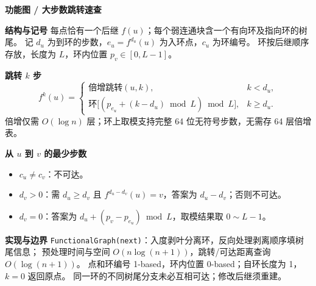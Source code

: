 \textbf{功能图 / 大步数跳转速查}

\textbf{结构与记号}
每点恰有一个后继 $f(u)$；每个弱连通块含一个有向环及指向环的树尾。
记 $d_u$ 为到环的步数，$e_u=f^{d_u}(u)$ 为入环点，$c_u$ 为环编号。
环按后继顺序存放，长度为 $L$，环内位置 $p_v\in[0,L-1]$。

\textbf{跳转 $k$ 步}
\[
f^k(u)=
\begin{cases}
\text{倍增跳转}(u,k),&k<d_u,\\
\text{环}\bigl[(p_{e_u}+(k-d_u)\bmod L)\bmod L\bigr],&k\ge d_u.
\end{cases}
\]
倍增仅需 $O(\log n)$ 层；环上取模支持完整 64 位无符号步数，无需存 64 层倍增表。

\textbf{从 $u$ 到 $v$ 的最少步数}
\begin{itemize}
    \item $c_u\ne c_v$：不可达。
    \item $d_v>0$：需 $d_u\ge d_v$ 且 $f^{d_u-d_v}(u)=v$，答案为 $d_u-d_v$；否则不可达。
    \item $d_v=0$：答案为 $d_u+(p_v-p_{e_u})\bmod L$，取模结果取 $0\sim L-1$。
\end{itemize}

\textbf{实现与边界}
\texttt{FunctionalGraph(next)}：入度剥叶分离环，反向处理剥离顺序填树尾信息；
预处理时间与空间 $O(n\log(n+1))$，跳转/可达距离查询 $O(\log(n+1))$。
点和环编号 1-based，环内位置 0-based；自环长度为 1，$k=0$ 返回原点。
同一环的不同树尾分支未必互相可达；修改后继须重建。
